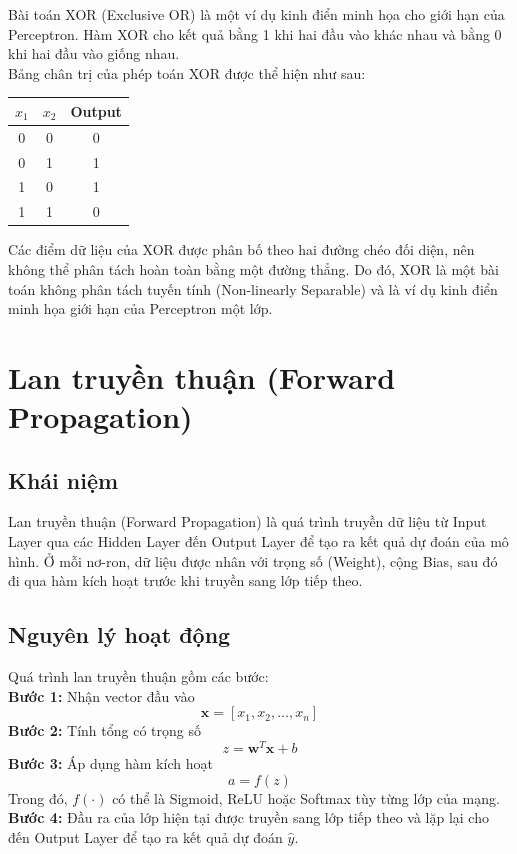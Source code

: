 \documentclass[12pt,a4paper]{report}
\begin{document}
Bài toán XOR (Exclusive OR) là một ví dụ kinh điển minh họa cho giới hạn của Perceptron. Hàm XOR cho kết quả bằng 1 khi hai đầu vào khác nhau và bằng 0 khi hai đầu vào giống nhau. \\
Bảng chân trị của phép toán XOR được thể hiện như sau:

\begin{table}[h]
\centering
\begin{tabular}{|c|c|c|}
\hline
$x_1$ & $x_2$ & Output \\
\hline
0 & 0 & 0 \\
0 & 1 & 1 \\
1 & 0 & 1 \\
1 & 1 & 0 \\
\hline
\end{tabular}
\end{table}

Các điểm dữ liệu của XOR được phân bố theo hai đường chéo đối diện, nên không thể phân tách hoàn toàn bằng một đường thẳng. Do đó, XOR là một bài toán không phân tách tuyến tính (Non-linearly Separable) và là ví dụ kinh điển minh họa giới hạn của Perceptron một lớp.

\setcounter{section}{3} %
\section{Lan truyền thuận (Forward Propagation)}
\subsection{Khái niệm}
Lan truyền thuận (Forward Propagation) là quá trình truyền dữ liệu từ Input Layer qua các Hidden Layer đến Output Layer để tạo ra kết quả dự đoán của mô hình. Ở mỗi nơ-ron, dữ liệu được nhân với trọng số (Weight), cộng Bias, sau đó đi qua hàm kích hoạt trước khi truyền sang lớp tiếp theo.

\subsection{Nguyên lý hoạt động}
Quá trình lan truyền thuận gồm các bước: \\
\textbf{Bước 1:} Nhận vector đầu vào
\begin{equation}
    \mathbf{x} = [x_1, x_2, \dots, x_n]
\end{equation}
\textbf{Bước 2:} Tính tổng có trọng số
\begin{equation}
    z = \mathbf{w}^T \mathbf{x} + b
\end{equation}
\textbf{Bước 3:} Áp dụng hàm kích hoạt
\begin{equation}
    a = f(z)
\end{equation}
Trong đó, $f(\cdot)$ có thể là Sigmoid, ReLU hoặc Softmax tùy từng lớp của mạng. \\
\textbf{Bước 4:} Đầu ra của lớp hiện tại được truyền sang lớp tiếp theo và lặp lại cho đến Output Layer để tạo ra kết quả dự đoán $\hat{y}$.
\end{document}
